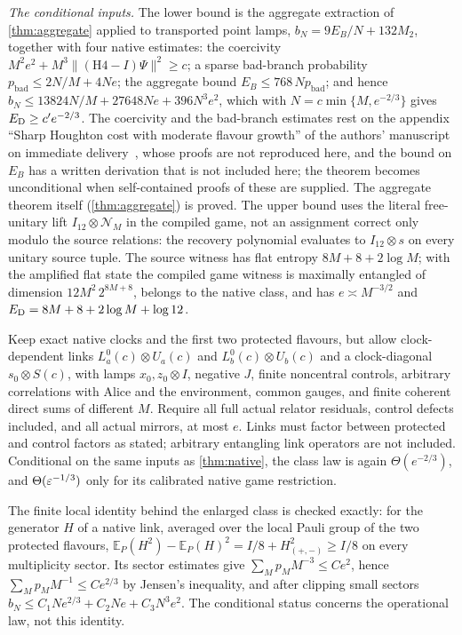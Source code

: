 \emph{The conditional inputs.} The lower bound is the aggregate extraction of \cref{thm:aggregate} applied to transported point
lamps, $b_N=9E_B/N+132M_2$, together with four native estimates: the coercivity $M^2e^2+M^3\|(\mathrm{H4}-I)\Psi\|^2\ge c$; a sparse
bad-branch probability $p_{\mathrm{bad}}\le2N/M+4Ne$; the aggregate bound $E_B\le768\,Np_{\mathrm{bad}}$; and hence
$b_N\le13824N/M+27648Ne+396N^3e^2$, which with $N=c\min\{M,e^{-2/3}\}$ gives $E_{\mathrm D}\ge c'e^{-2/3}$. The coercivity and the bad-branch
estimates rest on the appendix ``Sharp Houghton cost with moderate flavour growth'' of the authors' manuscript on
immediate delivery~\cite{DM-ID}, whose proofs are not reproduced here, and the bound on $E_B$ has a written derivation that is not included here; the theorem becomes unconditional when self-contained proofs of these are supplied. The aggregate theorem itself
(\cref{thm:aggregate}) is proved. The upper bound uses the literal free-unitary lift $I_{12}\otimes\mathcal N_M$ in the compiled game,
not an assignment correct only modulo the source relations: the recovery polynomial evaluates to $I_{12}\otimes s$ on every
unitary source tuple. The source witness has flat entropy $8M+8+2\log M$; with the amplified flat state the compiled game
witness is maximally entangled of dimension $12M^2\,2^{8M+8}$, belongs to the native class, and has $e\asymp M^{-3/2}$ and
$E_{\mathrm D}=8M+8+2\log M+\log12$.

\begin{theorem}\label{thm:native-enlarged}
Keep exact native clocks and the first two protected flavours, but allow clock-dependent links $L^0_a(c)\otimes U_a(c)$ and
$L^0_b(c)\otimes U_b(c)$ and a clock-diagonal $s_0\otimes S(c)$, with lamps $x_0,z_0\otimes I$, negative $J$, finite noncentral
controls, arbitrary correlations with Alice and the environment, common gauges, and finite coherent direct sums of different
$M$. Require all full actual relator residuals, control defects included, and all actual mirrors, at most $e$. Links must factor
between protected and control factors as stated; arbitrary entangling link operators are not included. Conditional on the same
inputs as \cref{thm:native}, the class law is again $\Theta(e^{-2/3})$, and $\Theta(\varepsilon^{-1/3})$ only for its calibrated
native game restriction.
\end{theorem}

The finite local identity behind the enlarged class is checked exactly: for the generator $H$ of a native link, averaged over the
local Pauli group of the two protected flavours, $\mathbb E_P(H^2)-\mathbb E_P(H)^2=I/8+H_{(+,-)}^2\ge I/8$ on every multiplicity
sector. Its sector estimates give $\sum_Mp_MM^{-3}\le Ce^2$, hence $\sum_Mp_MM^{-1}\le Ce^{2/3}$ by Jensen's inequality, and after
clipping small sectors $b_N\le C_1Ne^{2/3}+C_2Ne+C_3N^3e^2$. The conditional status concerns the operational law, not this
identity.
